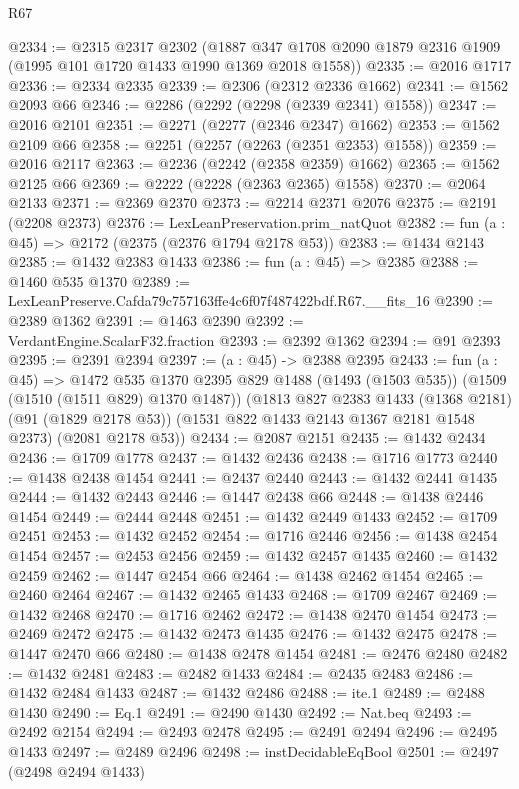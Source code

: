 \begin{lexlean}{R67}
\begin{coremodule}
@2334 := @2315
    @2317
    @2302
    (@1887 @347 @1708 @2090 @1879 @2316 @1909 (@1995 @101 @1720 @1433 @1990 @1369 @2018 @1558))
@2335 := @2016 @1717
@2336 := @2334 @2335
@2339 := @2306 (@2312 @2336 @1662)
@2341 := @1562 @2093 @66
@2346 := @2286 (@2292 (@2298 (@2339 @2341) @1558))
@2347 := @2016 @2101
@2351 := @2271 (@2277 (@2346 @2347) @1662)
@2353 := @1562 @2109 @66
@2358 := @2251 (@2257 (@2263 (@2351 @2353) @1558))
@2359 := @2016 @2117
@2363 := @2236 (@2242 (@2358 @2359) @1662)
@2365 := @1562 @2125 @66
@2369 := @2222 (@2228 (@2363 @2365) @1558)
@2370 := @2064 @2133
@2371 := @2369 @2370
@2373 := @2214 @2371 @2076
@2375 := @2191 (@2208 @2373)
@2376 := LexLeanPreservation.prim_natQuot
@2382 := fun (a : @45) => @2172 (@2375 (@2376 @1794 @2178 @53))
@2383 := @1434 @2143
@2385 := @1432 @2383 @1433
@2386 := fun (a : @45) => @2385
@2388 := @1460 @535 @1370
@2389 := LexLeanPreserve.Cafda79c757163ffe4c6f07f487422bdf.R67.__fits_16
@2390 := @2389 @1362
@2391 := @1463 @2390
@2392 := VerdantEngine.ScalarF32.fraction
@2393 := @2392 @1362
@2394 := @91 @2393
@2395 := @2391 @2394
@2397 := (a : @45) -> @2388 @2395
@2433 := fun (a : @45) =>
  @1472
    @535
    @1370
    @2395
    @829
    @1488
    (@1493 (@1503 @535))
    (@1509 (@1510 (@1511 @829) @1370 @1487))
    (@1813
      @827
      @2383
      @1433
      (@1368 @2181)
      (@91 (@1829 @2178 @53))
      (@1531 @822 @1433 @2143 @1367 @2181 @1548 @2373)
      (@2081 @2178 @53))
@2434 := @2087 @2151
@2435 := @1432 @2434
@2436 := @1709 @1778
@2437 := @1432 @2436
@2438 := @1716 @1773
@2440 := @1438 @2438 @1454
@2441 := @2437 @2440
@2443 := @1432 @2441 @1435
@2444 := @1432 @2443
@2446 := @1447 @2438 @66
@2448 := @1438 @2446 @1454
@2449 := @2444 @2448
@2451 := @1432 @2449 @1433
@2452 := @1709 @2451
@2453 := @1432 @2452
@2454 := @1716 @2446
@2456 := @1438 @2454 @1454
@2457 := @2453 @2456
@2459 := @1432 @2457 @1435
@2460 := @1432 @2459
@2462 := @1447 @2454 @66
@2464 := @1438 @2462 @1454
@2465 := @2460 @2464
@2467 := @1432 @2465 @1433
@2468 := @1709 @2467
@2469 := @1432 @2468
@2470 := @1716 @2462
@2472 := @1438 @2470 @1454
@2473 := @2469 @2472
@2475 := @1432 @2473 @1435
@2476 := @1432 @2475
@2478 := @1447 @2470 @66
@2480 := @1438 @2478 @1454
@2481 := @2476 @2480
@2482 := @1432 @2481
@2483 := @2482 @1433
@2484 := @2435 @2483
@2486 := @1432 @2484 @1433
@2487 := @1432 @2486
@2488 := ite.{1}
@2489 := @2488 @1430
@2490 := Eq.{1}
@2491 := @2490 @1430
@2492 := Nat.beq
@2493 := @2492 @2154
@2494 := @2493 @2478
@2495 := @2491 @2494
@2496 := @2495 @1433
@2497 := @2489 @2496
@2498 := instDecidableEqBool
@2501 := @2497 (@2498 @2494 @1433)

\end{coremodule}
\end{lexlean}
